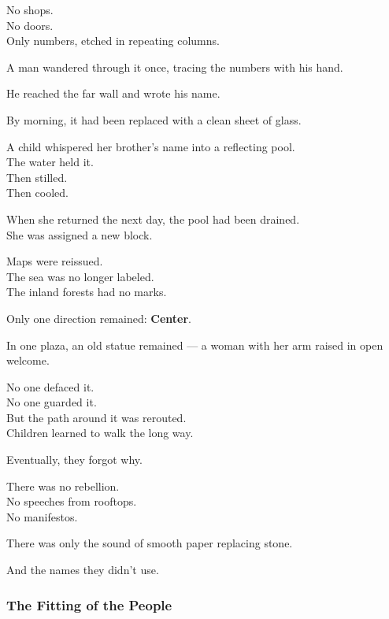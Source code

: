 \documentclass[12pt]{article}
\begin{document}
No shops.\\
No doors.\\
Only numbers, etched in repeating columns.

A man wandered through it once, tracing the numbers with his hand.

He reached the far wall and wrote his name.

By morning, it had been replaced with a clean sheet of glass.

\vspace{1em}

A child whispered her brother’s name into a reflecting pool.\\
The water held it.\\
Then stilled.\\
Then cooled.

When she returned the next day, the pool had been drained.\\
She was assigned a new block.

\vspace{1em}

Maps were reissued.\\
The sea was no longer labeled.\\
The inland forests had no marks.

Only one direction remained: \textbf{Center}.

\vspace{1em}

In one plaza, an old statue remained — a woman with her arm raised in open welcome.

No one defaced it.\\
No one guarded it.\\
But the path around it was rerouted.\\
Children learned to walk the long way.

Eventually, they forgot why.

\vspace{1em}

There was no rebellion.\\
No speeches from rooftops.\\
No manifestos.

There was only the sound of smooth paper replacing stone.

And the names they didn’t use.

\dotfill

\subsubsection{The Fitting of the People}
\end{document}
